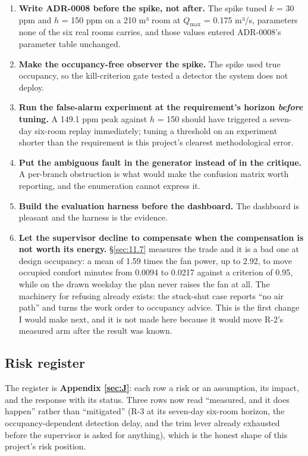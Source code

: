 \noindent\begin{minipage}{\linewidth}
\begin{enumerate}
\tightlist
\item \textbf{Write ADR-0008 before the spike, not after.} The spike tuned $k$ = 30 ppm and
  $h$ = 150 ppm on a 210 m³ room at $Q_\text{max}$ = 0.175 m³/s, parameters none of the six real
  rooms carries, and those values entered ADR-0008's parameter table unchanged.
\item \textbf{Make the occupancy-free observer the spike.} The spike used true occupancy, so the
  kill-criterion gate tested a detector the system does not deploy.
\item \textbf{Run the false-alarm experiment at the requirement's horizon \emph{before} tuning.} A
  149.1 ppm peak against $h$ = 150 should have triggered a seven-day six-room replay immediately;
  tuning a threshold on an experiment shorter than the requirement is this project's clearest
  methodological error.
\item \textbf{Put the ambiguous fault in the generator instead of in the critique.} A per-branch
  obstruction is what would make the confusion matrix worth reporting, and the enumeration cannot
  express it.
\item \textbf{Build the evaluation harness before the dashboard.} The dashboard is pleasant and the
  harness is the evidence.
\item \textbf{Let the supervisor decline to compensate when the compensation is not worth its
  energy.} §\ref{sec:11.7} measures the trade and it is a bad one at design occupancy: a mean of 1.59 times
  the fan power, up to 2.92, to move occupied comfort minutes from 0.0094 to 0.0217 against a
  criterion of 0.95, while on the drawn weekday the plan never raises the fan at all. The
  machinery for refusing already exists: the stuck-shut case reports ``no air path'' and turns the
  work order to occupancy advice. This is the first change I would make next, and it is not made
  here because it would move R-2's measured arm after the result was known.
\end{enumerate}
\end{minipage}

\subsection{Risk register}\label{sec:13.11}

The register is \textbf{Appendix \ref{sec:J}}: each row a risk or an assumption, its impact, and the response
with its status. Three rows now read ``measured, and it does happen'' rather than ``mitigated''
(R-3 at its seven-day six-room horizon, the occupancy-dependent detection delay, and the trim lever
already exhausted before the supervisor is asked for anything), which is the honest shape of this
project's risk position.\label{sec:13end}
